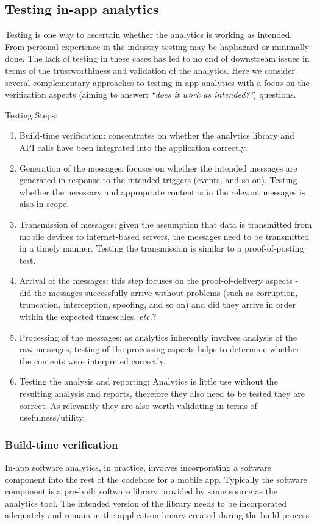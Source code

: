 \subsection{Testing in-app analytics}
Testing is one way to ascertain whether the analytics is working as intended. From personal experience in the industry testing may be haphazard or minimally done. The lack of testing in these cases has led to no end of downstream issues in terms of the trustworthiness and validation of the analytics. Here we consider several complementary approaches to testing in-app analytics with a focus on the verification aspects (aiming to answer: \emph{``does it work as intended?"}) questions.

Testing Steps:
\begin{enumerate}
    \item Build-time verification: concentrates on whether the analytics library and API calls have been integrated into the application correctly.
    \item Generation of the messages: focuses on whether the intended messages are generated in response to the intended triggers (events, and so on). Testing whether the necessary and appropriate content is in the relevant messages is also in scope. 
    \item Transmission of messages: given the assumption that data is transmitted from mobile devices to internet-based servers, the messages need to be transmitted in a timely manner. Testing the transmission is similar to a proof-of-posting test. 
    \item Arrival of the messages: this step focuses on the proof-of-delivery aspects - did the messages successfully arrive without problems (such as corruption, truncation, interception, spoofing, and so on) and did they arrive in order within the expected timescales, \emph{etc.}? 
    \item Processing of the messages: as analytics inherently involves analysis of the raw messages, testing of the processing aspects helps to determine whether the contents were interpreted correctly. 
    \item Testing the analysis and reporting: Analytics is little use without the resulting analysis and reports, therefore they also need to be tested they are correct. As relevantly they are also worth validating in terms of usefulness/utility. 
\end{enumerate}

\subsubsection{Build-time verification} 
In-app software analytics, in practice, involves incorporating a software component into the rest of the codebase for a mobile app. Typically the software component is a pre-built software library provided by same source as the analytics tool. The intended version of the library needs to be incorporated adequately and remain in the application binary created during the build process.

